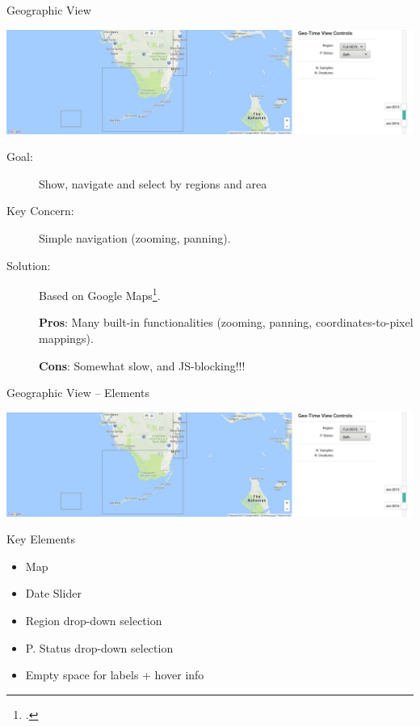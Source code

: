 \documentclass{beamer}
\begin{document}
\begin{frame}{Geographic View}

  \includegraphics[width=\textwidth]{./img/geo.png}

  \begin{description}

    \item[Goal:]  Show, navigate and select by regions and area

    \item[Key Concern:]  Simple navigation (zooming, panning).

    \item[Solution:]  Based on Google Maps\footcite{gmapsapi}.
      
      \textbf{Pros}:  Many built-in functionalities {\small (zooming, panning,
      coordinates-to-pixel mappings)}.

      \textbf{Cons}:  Somewhat slow, and JS-blocking!!!

  \end{description}

\end{frame}

\begin{frame}{Geographic View -- Elements}

  \includegraphics[width=\textwidth]{./img/geo.png}

  \begin{block}{Key Elements}
    
    \begin{itemize}

      \item Map

      \item Date Slider

      \item Region drop-down selection

      \item P. Status drop-down selection

      \item Empty space for labels + hover info

    \end{itemize}

  \end{block}

\end{frame}
\end{document}
